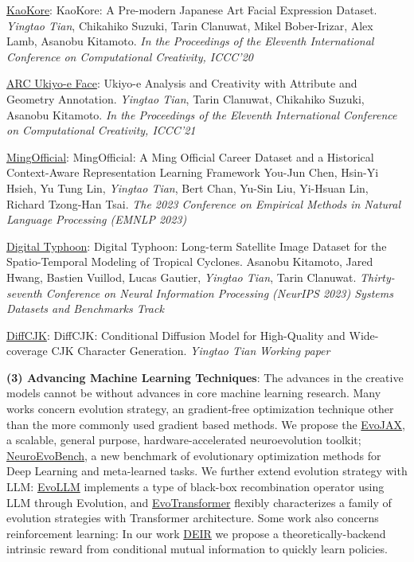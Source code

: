 \documentclass[line,margin]{cv}
\begin{document}
\begin{resume}
  \underline{KaoKore}: {KaoKore: A Pre-modern Japanese Art Facial Expression Dataset}.
  \emph{Yingtao Tian}, Chikahiko Suzuki, Tarin Clanuwat, Mikel Bober-Irizar, Alex Lamb, Asanobu Kitamoto. \emph{In the Proceedings of the Eleventh International Conference on Computational Creativity, ICCC'20}

  \underline{ARC Ukiyo-e Face}: {Ukiyo-e Analysis and Creativity with Attribute and Geometry Annotation}.
  \emph{Yingtao Tian}, Tarin Clanuwat, Chikahiko Suzuki, Asanobu Kitamoto. \emph{In the Proceedings of the Eleventh International Conference on Computational Creativity, ICCC'21}

  \underline{MingOfficial}: {MingOfficial: A Ming Official Career Dataset and a Historical Context-Aware Representation Learning Framework}
  You-Jun Chen, Hsin-Yi Hsieh, Yu Tung Lin, \emph{Yingtao Tian}, Bert Chan, Yu-Sin Liu, Yi-Hsuan Lin, Richard Tzong-Han Tsai. \emph{The 2023 Conference on Empirical Methods in Natural Language Processing (EMNLP 2023)}

  \underline{Digital Typhoon}: {Digital Typhoon: Long-term Satellite Image Dataset for the Spatio-Temporal Modeling of Tropical Cyclones}.
  Asanobu Kitamoto, Jared Hwang, Bastien Vuillod, Lucas Gautier, \emph{Yingtao Tian}, Tarin Clanuwat. \emph{Thirty-seventh Conference on Neural Information Processing (NeurIPS 2023) Systems Datasets and Benchmarks Track}

  \underline{DiffCJK}: {DiffCJK: Conditional Diffusion Model for High-Quality and Wide-coverage CJK Character Generation}.
  \emph{Yingtao Tian} \emph{Working paper}

  \textbf{(3) Advancing Machine Learning Techniques}: The advances in the creative models cannot be without advances in core machine learning research.
  Many works concern {evolution strategy}, an gradient-free optimization technique other than the more commonly used gradient based methods. 
  We propose the \underline{EvoJAX}, a scalable, general purpose, hardware-accelerated {neuroevolution toolkit}; \underline{NeuroEvoBench}, a new {benchmark of evolutionary optimization methods} for Deep Learning and meta-learned tasks.  
  We further extend evolution strategy with LLM: \underline{EvoLLM} implements a type of {black-box recombination operator using LLM through Evolution}, and \underline{EvoTransformer} flexibly characterizes a family of {evolution strategies with Transformer architecture}.
  Some work also concerns {reinforcement learning}: In our work \underline{DEIR} we propose a theoretically-backend intrinsic reward from conditional mutual information to quickly learn policies.



\end{resume}
\end{document}
